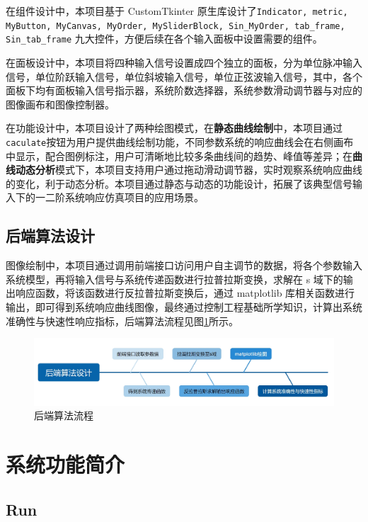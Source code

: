 \documentclass[12pt]{ctexart}
\begin{document}
在组件设计中，本项目基于 CustomTkinter 原生库设计了\texttt{Indicator, metric, MyButton, MyCanvas, MyOrder, MySliderBlock, Sin_MyOrder, tab_frame, Sin_tab_frame} 九大控件，方便后续在各个输入面板中设置需要的组件。

在面板设计中，本项目将四种输入信号设置成四个独立的面板，分为单位脉冲输入信号，单位阶跃输入信号，单位斜坡输入信号，单位正弦波输入信号，其中，各个面板下均有面板输入信号指示器，系统阶数选择器，系统参数滑动调节器与对应的图像画布和图像控制器。

在功能设计中，本项目设计了两种绘图模式，在\textbf{静态曲线绘制}中，本项目通过\texttt{caculate}按钮为用户提供曲线绘制功能，不同参数系统的响应曲线会在右侧画布中显示，配合图例标注，用户可清晰地比较多条曲线间的趋势、峰值等差异；在\textbf{曲线动态分析}模式下，本项目支持用户通过拖动滑动调节器，实时观察系统响应曲线的变化，利于动态分析。本项目通过静态与动态的功能设计，拓展了该典型信号输入下的一二阶系统响应仿真项目的应用场景。

\subsection{后端算法设计}

图像绘制中，本项目通过调用前端接口访问用户自主调节的数据，将各个参数输入系统模型，再将输入信号与系统传递函数进行拉普拉斯变换，求解在 s 域下的输出响应函数，将该函数进行反拉普拉斯变换后，通过 matplotlib 库相关函数进行输出，即可得到系统响应曲线图像，最终通过控制工程基础所学知识，计算出系统准确性与快速性响应指标，后端算法流程见图\ref{figure3}所示。

\begin{figure}
    \centering
    \includegraphics[width=\textwidth]{img/back_design.png}
    \caption{后端算法流程}\label{figure3}
\end{figure}

\section{系统功能简介}

\subsection{Run}
\end{document}
